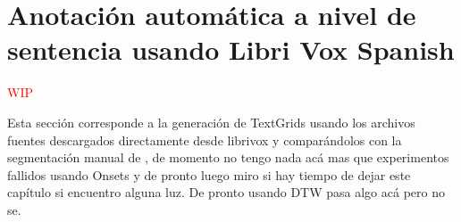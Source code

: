 \section{Anotación automática a nivel de sentencia usando Libri Vox Spanish}

\textcolor{red}{WIP}

Esta sección corresponde a la generación de TextGrids usando los archivos fuentes descargados directamente desde librivox y comparándolos con la segmentación manual de \cite{LibriVox-Spanish}, de momento no tengo nada acá mas que experimentos fallidos usando Onsets y de pronto luego miro si hay tiempo de dejar este capítulo si encuentro alguna luz. De pronto usando DTW pasa algo acá pero no se.

